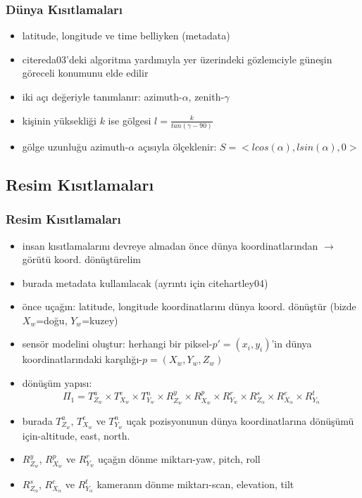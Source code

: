 \documentclass{beamer}
\begin{document}
\begin{frame}
	\frametitle{Dünya Kısıtlamaları}

	\begin{itemize}
		\item latitude, longitude ve time belliyken (metadata)
		\item cite{reda03}'deki algoritma yardımıyla yer üzerindeki gözlemciyle
			güneşin göreceli konumunu elde edilir
		\item iki açı değeriyle tanımlanır: azimuth-$\alpha$, zenith-$\gamma$
		\item kişinin yüksekliği $k$ ise gölgesi $l = \frac{k}{tan(\gamma - 90)}$
		\item \label{eq:golge-olcekli}gölge uzunluğu azimuth-$\alpha$ açısıyla ölçeklenir:
			$S = <l	cos(\alpha), l sin(\alpha), 0>$
	\end{itemize}
\end{frame}

\subsection{Resim Kısıtlamaları}

\begin{frame}[allowframebreaks]
	\frametitle{Resim Kısıtlamaları}

	\begin{itemize}
		\item insan kısıtlamalarını devreye almadan önce dünya
			koordinatlarından $\rightarrow$ görütü koord. dönüştürelim
		\item burada metadata kullanılacak (ayrıntı için cite{hartley04})
		\item önce uçağın: latitude, longitude koordinatlarını dünya koord.
			dönüştür (bizde $X_w$=doğu, $Y_w$=kuzey)
		\item sensör modelini oluştur: herhangi bir piksel-$p'=(x_i, y_i)$'in
			dünya koordinatlarındaki karşılığı-$p=(X_w, Y_w, Z_w)$
		\item dönüşüm yapısı:
			\begin{equation}
				\Pi_1 = T^a_{Z_w} \times T^e_{X_w} \times T^n_{Y_w} \times
					R^y_{Z_w} \times R^p_{X_w} \times R^r_{Y_w} \times
					R^s_{Z_\alpha} \times R^e_{X_\alpha} \times R^t_{Y_\alpha}
					\label{eq:sensor-matrisi}
			\end{equation}
		\item burada $T^a_{Z_w}$, $T^e_{X_w}$ ve $T^n_{Y_w}$ uçak pozisyonunun
			dünya koordinatlarına dönüşümü için-altitude, east, north.
		\item $R^y_{Z_w}$, $R^p_{X_w}$ ve $R^r_{Y_w}$ uçağın dönme miktarı-yaw,
			pitch, roll
		\item $R^s_{Z_\alpha}$, $R^e_{X_\alpha}$ ve $R^t_{Y_\alpha}$ kameranın
			dönme miktarı-scan, elevation, tilt
	\end{itemize}
\end{frame}
\end{document}
